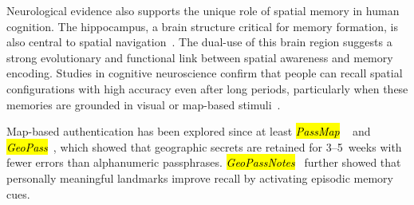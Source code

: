 \documentclass[mathematics,article,accept,pdftex,moreauthors]{Definitions/mdpi}
\begin{document}
Neurological evidence also supports the unique role of spatial memory in human cognition. The hippocampus, a brain structure critical for memory formation, is also central to spatial navigation~\cite{McNaughton1991}. The dual-use of this brain region suggests a strong evolutionary and functional link between spatial awareness and memory encoding. Studies in cognitive neuroscience confirm that people can recall spatial configurations with high accuracy even after long periods, particularly when these memories are grounded in visual or map-based stimuli~\cite{Konkle2010, Lukavsky2017}.



{Map-based authentication has been explored since at least \textit{\hl{PassMap} %
}~\cite{Sun2012} and \textit{\hl{GeoPass}}~\cite{Thorpe2013}, which showed that geographic secrets are retained for 3--5~weeks with fewer errors than alphanumeric passphrases. \textit{\hl{GeoPassNotes}}~\cite{MacRae2016} further showed that personally meaningful landmarks improve recall by activating episodic memory cues.}
\end{document}
